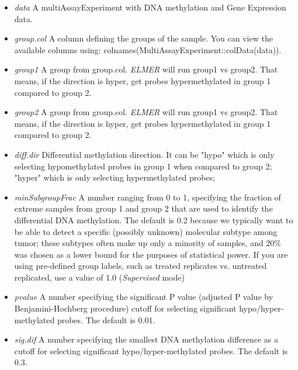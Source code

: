 \begin{itemize}
\item \textit{data} A multiAssayExperiment with DNA methylation and Gene Expression data.
\item  \textit{group.col}	A column defining the groups of the sample. You can view the available columns using: colnames(MultiAssayExperiment::colData(data)).
\item  \textit{group1}	A group from group.col. \textit{ELMER} will run group1 vs group2. That means, if the direction is hyper, get probes hypermethylated in group 1 compared to group 2.
\item  \textit{group2}	A group from group.col. \textit{ELMER} will run group1 vs group2. That means, if the direction is hyper, get probes hypermethylated in group 1 compared to group 2.
\item \textit{diff.dir} Differential methylation direction. It can be "hypo" which is only selecting hypomethylated probes in group 1 when compared to group 2; "hyper" which is only selecting hypermethylated probes;
\item  \textit{minSubgroupFrac} A number ranging from 0 to 1, specifying the fraction of extreme samples from group 1 and group 2 that are used to identify the differential DNA methylation. The default is 0.2 because we typically want to be able to detect a specific (possibly unknown) molecular subtype among tumor; these subtypes often make up only a minority of samples, and 20\% was chosen as a lower bound for the purposes of statistical power. If you are using pre-defined group labels, such as treated replicates vs. untreated replicated, use a value of 1.0 (\textit{Supervised} mode)

\item  \textit{pvalue} A number specifying the significant P value (adjusted P value by Benjamini-Hochberg procedure) cutoff for selecting significant hypo/hyper-methylated probes. The default is 0.01.
\item  \textit{sig.dif} A number specifying the smallest DNA methylation difference as a cutoff for selecting significant hypo/hyper-methylated probes. The default is 0.3.
\end{itemize}

%

